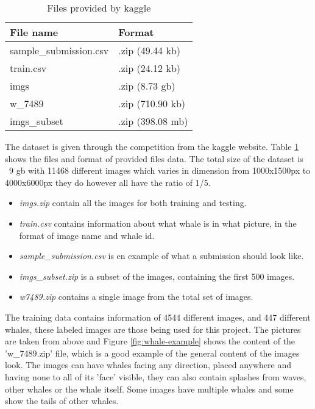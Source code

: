 \begin{table}
	\centering
	\caption{Files provided by kaggle}
	\label{table:dataset-files}
	\begin{tabular}{|l|l|}
		\hline
		File name              & Format           \\ \hline \hline
		sample\_submission.csv & .zip (49.44 kb)  \\ \hline
		train.csv              & .zip (24.12 kb)  \\ \hline
		imgs                   & .zip (8.73 gb)   \\ \hline
		w\_7489                & .zip (710.90 kb) \\ \hline
		imgs\_subset           & .zip (398.08 mb) \\ \hline
	\end{tabular}
\end{table}

The dataset is given through the competition from the kaggle website. Table \ref{table:dataset-files} shows the files and format of provided files data. The total size of the dataset is ~9 gb with 11468 different images which varies in dimension from 1000x1500px to 4000x6000px they do however all have the ratio of 1/5.

\begin{itemize}
	\item \emph{imgs.zip} contain all the images for both training and testing.
	\item \emph{train.csv} contains information about what whale is in what picture, in the format of image name and whale id.
	\item \emph{sample\_submission.csv} is en example of what a submission should look like.
	\item \emph{imgs\_subset.zip} is a subset of the images, containing the first 500 images.
	\item \emph{w\-7489.zip} contains a single image from the total set of images.
\end{itemize}

The training data contains information of 4544 different images, and 447 different whales, these labeled images are those being used for this project. The pictures are taken from above and Figure \ref{fig:whale-example} shows the content of the 'w\_7489.zip' file, which is a good example of the general content of the images look. The images can have whales facing any direction, placed anywhere and having none to all of its 'face' visible, they can also contain splashes from waves, other whales or the whale itself. Some images have multiple whales and some show the tails of other whales.

